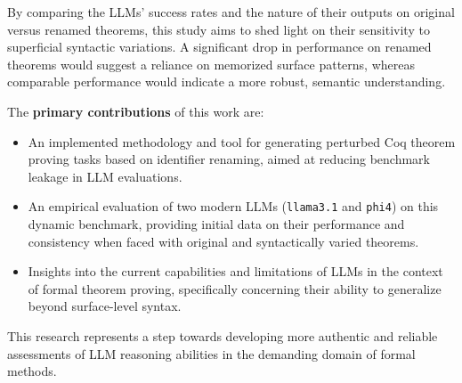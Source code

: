 By comparing the LLMs' success rates and the nature of their outputs on original versus renamed theorems, this study aims to shed light on their sensitivity to superficial syntactic variations. A significant drop in performance on renamed theorems would suggest a reliance on memorized surface patterns, whereas comparable performance would indicate a more robust, semantic understanding.

The \textbf{primary contributions} of this work are:
\begin{itemize}
    \item An implemented methodology and tool for generating perturbed Coq theorem proving tasks based on identifier renaming, aimed at reducing benchmark leakage in LLM evaluations.
    \item An empirical evaluation of two modern LLMs (\texttt{llama3.1} and \texttt{phi4}) on this dynamic benchmark, providing initial data on their performance and consistency when faced with original and syntactically varied theorems.
    \item Insights into the current capabilities and limitations of LLMs in the context of formal theorem proving, specifically concerning their ability to generalize beyond surface-level syntax.
\end{itemize}

This research represents a step towards developing more authentic and reliable assessments of LLM reasoning abilities in the demanding domain of formal methods.